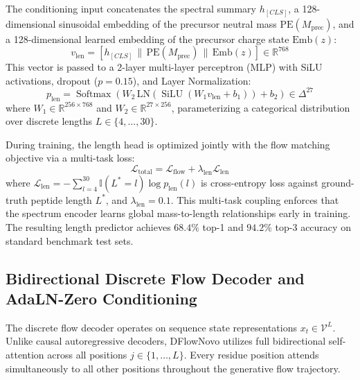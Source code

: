 The conditioning input concatenates the spectral summary $h_{[CLS]}$, a 128-dimensional sinusoidal embedding of the precursor neutral mass $\text{PE}(M_{\text{prec}})$, and a 128-dimensional learned embedding of the precursor charge state $\text{Emb}(z)$:
\begin{equation}
v_{\text{len}} = \left[ h_{[CLS]} \,\|\, \text{PE}(M_{\text{prec}}) \,\|\, \text{Emb}(z) \right] \in \mathbb{R}^{768}
\label{eq:length_input}
\end{equation}
This vector is passed to a 2-layer multi-layer perceptron (MLP) with SiLU activations, dropout ($p = 0.15$), and Layer Normalization:
\begin{equation}
p_{\text{len}} = \operatorname{Softmax}\left( W_2 \, \text{LN}\left( \operatorname{SiLU}(W_1 v_{\text{len}} + b_1) \right) + b_2 \right) \in \Delta^{27}
\label{eq:length_head}
\end{equation}
where $W_1 \in \mathbb{R}^{256 \times 768}$ and $W_2 \in \mathbb{R}^{27 \times 256}$, parameterizing a categorical distribution over discrete lengths $L \in \{4, \dots, 30\}$. 

During training, the length head is optimized jointly with the flow matching objective via a multi-task loss:
\begin{equation}
\mathcal{L}_{\text{total}} = \mathcal{L}_{\text{flow}} + \lambda_{\text{len}} \mathcal{L}_{\text{len}}
\label{eq:multitask_loss}
\end{equation}
where $\mathcal{L}_{\text{len}} = -\sum_{l=4}^{30} \mathbb{I}(L^* = l) \log p_{\text{len}}(l)$ is cross-entropy loss against ground-truth peptide length $L^*$, and $\lambda_{\text{len}} = 0.1$. This multi-task coupling enforces that the spectrum encoder learns global mass-to-length relationships early in training. The resulting length predictor achieves $68.4\%$ top-1 and $94.2\%$ top-3 accuracy on standard benchmark test sets.

\subsection{Bidirectional Discrete Flow Decoder and AdaLN-Zero Conditioning}
\label{subsec:decoder_adaln}

The discrete flow decoder operates on sequence state representations $x_t \in \mathcal{V}^L$. Unlike causal autoregressive decoders, DFlowNovo utilizes full bidirectional self-attention across all positions $j \in \{1, \dots, L\}$. Every residue position attends simultaneously to all other positions throughout the generative flow trajectory.

